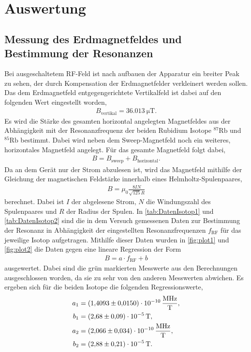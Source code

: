 \section{Auswertung}
\label{sec:Auswertung}

\subsection{Messung des Erdmagnetfeldes und Bestimmung der Resonanzen}
\label{subsec:Erdmagnetfeld}

Bei ausgeschaltetem RF-Feld ist nach aufbauen der Apparatur ein breiter Peak zu sehen, der durch Kompensation der Erdmagnetfelder verkleinert werden sollen.
Das dem Erdmagnetfeld entgegengerichtete Vertikalfeld ist dabei auf den folgenden Wert eingestellt worden,
\begin{align*}
    B_{\text{vertikal}} = \SI{36.013}{\micro\tesla}.
\end{align*}
Es wird die Stärke des gesamten horizontal angelegten Magnetfeldes aus der Abhängigkeit mit der Resonanzfrequenz der beiden Rubidium Isotope $^{87}\text{Rb}$ und $^{85}\text{Rb}$
bestimmt. Dabei wird neben dem Sweep-Magnetfeld noch ein weiteres, horizontales Magnetfeld angelegt. Für das gesamte Magnetfeld folgt dabei,
\begin{align}
    B=B_{\text{sweep}} + B_{\text{horizontal}}.
\end{align}
Da an dem Gerät nur der Strom abzulesen ist, wird das Magnetfeld mithilfe der Gleichung der magnetischen Feldstärke innerhalb eines Helmholtz-Spulenpaares,
\begin{align}
    B=\mu_0\frac{8IN}{\sqrt{125}R}
\end{align}
berechnet. Dabei ist $I$ der abgelesene Strom, $N$ die Windungszahl des Spulenpaares und $R$ der Radius der Spulen.
In \autoref{tab:DatenIsotop1} und \autoref{tab:DatenIsotop2} sind die in dem Versuch gemessenen Daten zur Bestimmung der Resonanz in Abhängigkeit der eingestellten Resonanzfrequenzen
$f_{\text{RF}}$ für das jeweilige Isotop aufgetragen. Mithilfe dieser Daten wurden in \autoref{fig:plot1} und \autoref{fig:plot2} die Daten gegen eine lineare Regression der Form
\begin{align}
    B=a\cdot f_{\text{RF}} + b
\end{align}
ausgewertet. Dabei sind die grün markierten Messwerte aus den Berechnungen ausgeschlossen worden, da sie zu sehr von den anderen Messwerten abwichen.
Es ergeben sich für die beiden Isotope die folgenden Regressionswerte,
\begin{align*}
    a_1 &= \SI{1.4093 \pm 0.015 e-10}{\mega\hertz\per\tesla}, \\
    b_1 &= \SI{2.68 \pm 0.09 e-5}{\tesla}, \\
    a_2 &= \SI{2.066 \pm 0.034 e-10}{\mega\hertz\per\tesla}, \\
    b_2 &= \SI{2.88 \pm 0.21 e-5}{\tesla}.
\end{align*}

